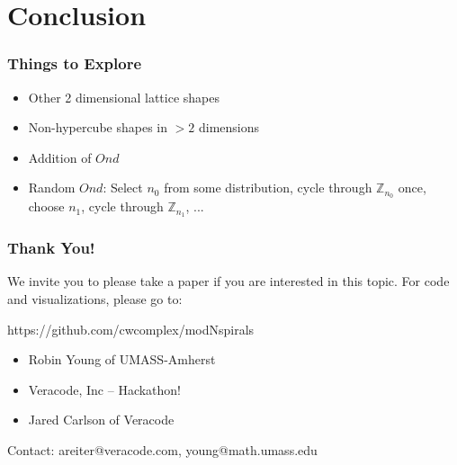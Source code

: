 \documentclass{beamer}
\theoremstyle{mydef}
\begin{document}
\section{Conclusion}
\frame
{
  \frametitle{Things to Explore}
  \begin{itemize}
  \item Other 2 dimensional lattice shapes
  \item Non-hypercube shapes in $>2$ dimensions
  \item Addition of $Ond$
  \item Random $Ond$: Select $n_0$ from some distribution, cycle through $\mathbb{Z}_{n_0}$ once, choose $n_1$,  cycle through $\mathbb{Z}_{n_1}$, ...
  \end{itemize}
}
\frame
{
  \frametitle{Thank You!}
  We invite you to please take a paper if you are interested in this topic. For code and visualizations, please go to:
  
  \begin{center}
  https://github.com/cwcomplex/modNspirals
  \end{center}
  \begin{itemize}
  \item Robin Young of UMASS-Amherst
  \item Veracode, Inc -- Hackathon!
  \item Jared Carlson of Veracode
  \end{itemize}
  Contact: areiter@veracode.com, young@math.umass.edu
}
\end{document}
